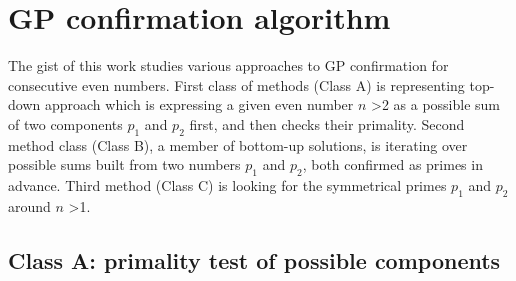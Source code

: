 \documentclass[10pt,twocolumn]{article}
\begin{document}
\section{GP confirmation algorithm}

The gist of this work studies various approaches to GP confirmation for consecutive even numbers. First class of methods (Class A) is representing top-down approach which is expressing a given even number $n$ \textgreater 2 as a possible sum of two components $p_1$ and $p_2$ first, and then checks their primality.
Second method class (Class B), a member of bottom-up solutions, is iterating over possible sums built from two numbers $p_1$ and $p_2$, both confirmed as primes in advance. Third method (Class C) is looking for the symmetrical primes $p_1$ and $p_2$ around $n$ \textgreater 1.

\subsection{Class A: primality test of possible components}
\end{document}
